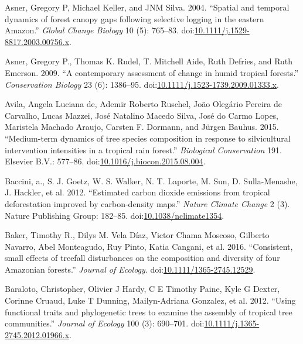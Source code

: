 \documentclass[]{elsarticle} %
\begin{document}
\hypertarget{ref-Asner2004}{}
Asner, Gregory P, Michael Keller, and JNM Silva. 2004. ``Spatial and
temporal dynamics of forest canopy gaps following selective logging in
the eastern Amazon.'' \emph{Global Change Biology} 10 (5): 765--83.
doi:\href{https://doi.org/10.1111/j.1529-8817.2003.00756.x}{10.1111/j.1529-8817.2003.00756.x}.

\hypertarget{ref-Asner2009}{}
Asner, Gregory P., Thomas K. Rudel, T. Mitchell Aide, Ruth Defries, and
Ruth Emerson. 2009. ``A contemporary assessment of change in humid
tropical forests.'' \emph{Conservation Biology} 23 (6): 1386--95.
doi:\href{https://doi.org/10.1111/j.1523-1739.2009.01333.x}{10.1111/j.1523-1739.2009.01333.x}.

\hypertarget{ref-DeAvila2015}{}
Avila, Angela Luciana de, Ademir Roberto Ruschel, João Olegário Pereira
de Carvalho, Lucas Mazzei, José Natalino Macedo Silva, José do Carmo
Lopes, Maristela Machado Araujo, Carsten F. Dormann, and Jürgen Bauhus.
2015. ``Medium-term dynamics of tree species composition in response to
silvicultural intervention intensities in a tropical rain forest.''
\emph{Biological Conservation} 191. Elsevier B.V.: 577--86.
doi:\href{https://doi.org/10.1016/j.biocon.2015.08.004}{10.1016/j.biocon.2015.08.004}.

\hypertarget{ref-Baccini2012a}{}
Baccini, a., S. J. Goetz, W. S. Walker, N. T. Laporte, M. Sun, D.
Sulla-Menashe, J. Hackler, et al. 2012. ``Estimated carbon dioxide
emissions from tropical deforestation improved by carbon-density maps.''
\emph{Nature Climate Change} 2 (3). Nature Publishing Group: 182--85.
doi:\href{https://doi.org/10.1038/nclimate1354}{10.1038/nclimate1354}.

\hypertarget{ref-Baker2016}{}
Baker, Timothy R., Dilys M. Vela Díaz, Victor Chama Moscoso, Gilberto
Navarro, Abel Monteagudo, Ruy Pinto, Katia Cangani, et al. 2016.
``Consistent, small effects of treefall disturbances on the composition
and diversity of four Amazonian forests.'' \emph{Journal of Ecology}.
doi:\href{https://doi.org/10.1111/1365-2745.12529}{10.1111/1365-2745.12529}.

\hypertarget{ref-Baraloto2012a}{}
Baraloto, Christopher, Olivier J Hardy, C E Timothy Paine, Kyle G
Dexter, Corinne Cruaud, Luke T Dunning, Mailyn-Adriana Gonzalez, et al.
2012. ``Using functional traits and phylogenetic trees to examine the
assembly of tropical tree communities.'' \emph{Journal of Ecology} 100
(3): 690--701.
doi:\href{https://doi.org/10.1111/j.1365-2745.2012.01966.x}{10.1111/j.1365-2745.2012.01966.x}.
\end{document}
